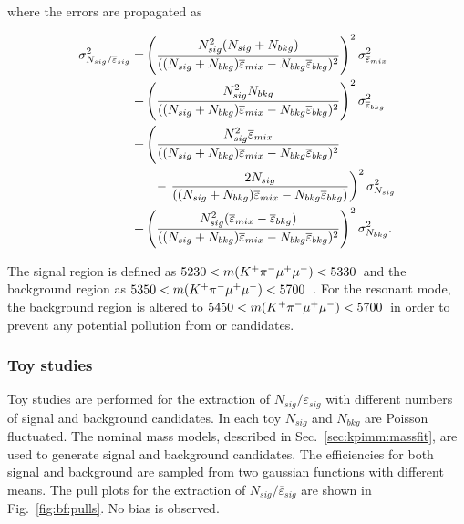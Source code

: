 \noindent where the errors are propagated as
 
\begin{equation}
\begin{aligned}
\sigma_{N_{sig}/\overline{\varepsilon}_{sig}}^{2} =&
\left(\frac{N_{sig}^{2}(N_{sig}+N_{bkg})}{((N_{sig}+N_{bkg})\overline{\varepsilon}_{mix} -  N_{bkg}\overline{\varepsilon}_{bkg})^2}\right)^{2}\sigma_{\overline{\varepsilon}_{mix}}^{2}\\
+& \left(\frac{N_{sig}^{2}N_{bkg}}{((N_{sig}+N_{bkg})\overline{\varepsilon}_{mix} -  N_{bkg}\overline{\varepsilon}_{bkg})^2}\right)^{2}\sigma_{\overline{\varepsilon}_{bkg}}^{2}\\
+& \left(\frac{N_{sig}^{2}\overline{\varepsilon}_{mix}}{((N_{sig}+N_{bkg})\overline{\varepsilon}_{mix} -  N_{bkg}\overline{\varepsilon}_{bkg})^2} \right. \\
&\hphantom{-}- \left.  \frac{2N_{sig}}{((N_{sig}+N_{bkg})\overline{\varepsilon}_{mix} -  N_{bkg}\overline{\varepsilon}_{bkg})} \right)^{2}\sigma_{N_{sig}}^{2}\\
+& \left(\frac{N_{sig}^{2}(\overline{\varepsilon}_{mix} - \overline{\varepsilon}_{bkg})}{((N_{sig}+N_{bkg})\overline{\varepsilon}_{mix} -  N_{bkg}\overline{\varepsilon}_{bkg})^2}\right)^{2}\sigma_{N_{bkg}}^{2}.
\end{aligned}
\end{equation}
 
The signal region is defined as $5230<m({{K}^+}{{\pi}^-}{\mu^+}{\mu^-})<5330$~\mevcc and the background region as $5350<m({{K}^+}{{\pi}^-}{\mu^+}{\mu^-})<5700$~\mevcc. For the resonant mode, the background region is altered to $5450<m({{K}^+}{{\pi}^-}{\mu^+}{\mu^-})<5700$~\mevcc in order to prevent any potential pollution from \BdToJPsiKst or \BsToJPsiKst candidates.

\subsubsection{Toy studies}
 
Toy studies are performed for the extraction of $N_{sig}/\overline{\varepsilon}_{sig}$ with different numbers of signal and background candidates.  In each toy $N_{sig}$ and $N_{bkg}$ are Poisson fluctuated.  The nominal mass models, described in Sec.~\ref{sec:kpimm:massfit}, are used to generate signal and background candidates. The efficiencies for both signal and background are sampled from two gaussian functions with different means.  The pull plots for the extraction of $N_{sig}/\overline{\varepsilon}_{sig}$ are shown in Fig.~\ref{fig:bf:pulls}. No bias is observed.
 
